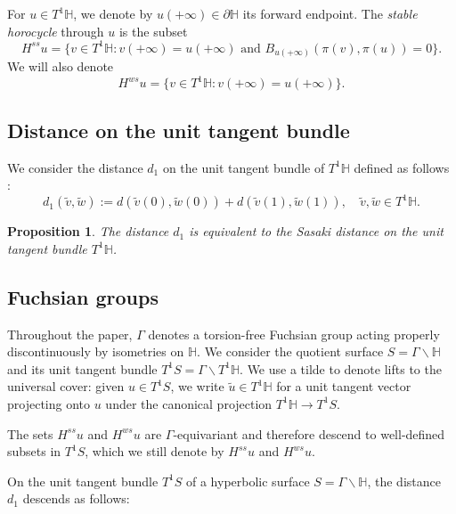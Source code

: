 \documentclass[a4paper,english,reqno]{amsart}
\renewcommand{\H}{\mathbb{H}}
\newtheorem{proposition}{Proposition}
\theoremstyle{definition}
\numberwithin{equation}{section}
\begin{document}
	\medskip
	
	For $u\in T^1\mathbb H$, we denote by $u(+\infty)\in\partial\mathbb H$ its forward endpoint. 
	The \emph{stable horocycle} through $u$ is the subset
	\[
	H^{ss} u
	=
	\{ v\in T^1\mathbb H : v(+\infty)=u(+\infty) 
	\text{ and } 
	B_{u(+\infty)}(\pi(v),\pi(u))=0 \}. 
	\] We will also denote 
	\[
	H^{ws} u
	=
	\{ v\in T^1\mathbb H : v(+\infty)=u(+\infty)  \}. 
	\]
	
	\medskip
	
	\subsection{Distance on the unit tangent bundle}
	
	
	
	We consider the distance $d_1$ on the unit tangent bundle of $T^1\H$ defined as follows \cite{ballmannlectures}:
	$$ d_1(\tilde v,\tilde w):=d(\tilde v(0),\tilde w(0))+d(\tilde v(1),\tilde w(1)), \quad \tilde v, \tilde w \in T^1 \H.$$
	
	\begin{proposition}
		The distance $d_1$ is equivalent to the Sasaki distance on the unit tangent bundle $T^1 \H$. %
	\end{proposition}
	
	
	
	\medskip
	
	\subsection{Fuchsian groups}
	Throughout the paper, $\Gamma$ denotes a torsion-free Fuchsian group acting properly discontinuously by isometries on $\mathbb H$. 
	We consider the quotient surface $S=\Gamma\backslash\mathbb H$
	and its unit tangent bundle
	$	T^1S=\Gamma\backslash T^1\mathbb H$.
	We use a tilde to denote lifts to the universal cover: given $u\in T^1S$, we write $\tilde u\in T^1\mathbb H$ for a unit tangent vector projecting onto $u$ under the canonical projection $T^1\mathbb H\to T^1S$.
	
	The sets $H^{ss}u$ and $H^{ws}u$ are $\Gamma$-equivariant and therefore descend to well-defined subsets in $T^1S$, which we still denote by $H^{ss}u$ and $H^{ws}u$.
	
	On the unit tangent bundle $T^1 S$ of a hyperbolic surface $S=\Gamma\backslash\mathbb H $, the distance $d_1$ descends as follows: 
	
\end{document}
